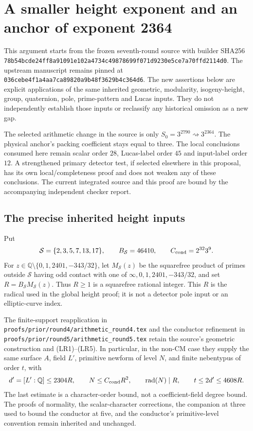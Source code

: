 \section{A smaller height exponent and an anchor of exponent 2364}

This argument starts from the frozen seventh-round source with builder
SHA256 \texttt{78b54bcde24ff8a91091e102a4734c49878699f071d9230e5ce7a70ffd2114d0}.
The upstream manuscript remains pinned at
\texttt{036cebe4f1a4aa7ca89820a9b48f3629b4c364d6}.
The new assertions below are explicit applications of the same inherited
geometric, modularity, isogeny-height, group, quaternion, pole, prime-pattern
and Lucas inputs. They do not independently establish those inputs or
reclassify any historical omission as a new gap.

The selected arithmetic change in the source is only
$S_0=3^{2790}\rightsquigarrow3^{2364}$. The physical anchor's packing
coefficient stays equal to three. The local conclusions consumed here
remain scalar order $28$, Lucas-label order $45$ and input-label order $12$.
A strengthened primary detector test, if selected elsewhere in this
proposal, has its own local/completeness proof and does not weaken any of
these conclusions. The current integrated source and this proof are bound
by the accompanying independent checker report.

\subsection{The precise inherited height inputs}

Put
\[
 \mathcal S=\{2,3,5,7,13,17\},\qquad B_{\mathcal S}=46410,
 \qquad C_{\rm cond}=2^{32}3^9.
\]
For $z\in\mathbb Q\setminus\{0,1,2401,-343/32\}$, let
$M_{\mathcal S}(z)$ be the squarefree product of primes outside
$\mathcal S$ having odd contact with one of
$\infty,0,1,2401,-343/32$, and set
$R=B_{\mathcal S}M_{\mathcal S}(z)$.
Thus $R\ge1$ is a squarefree rational integer. This $R$ is the radical
used in the global height proof; it is not a detector pole input or an
elliptic-curve index.

The finite-support reapplication in
\texttt{proofs/prior/round4/arithmetic\_round4.tex} and the conductor
refinement in \texttt{proofs/prior/round5/arithmetic\_round5.tex} retain
the source's geometric construction and (LR1)--(LR5). In particular, in
the non-CM case they supply the same surface $A$, field $L'$, primitive
newform of level $N$, and finite nebentypus of order $t$, with
\[
 d'=[L':\mathbb Q]\le2304R,\qquad
 N\le C_{\rm cond}R^2,\qquad \operatorname{rad}(N)\mid R,
 \qquad t\le2d'\le4608R.
\]
The last estimate is a character-order bound, not a coefficient-field
degree bound. The proofs of normality, the scalar-character corrections,
the companion at three used to bound the conductor at five, and the
conductor's primitive-level convention remain inherited and unchanged.

